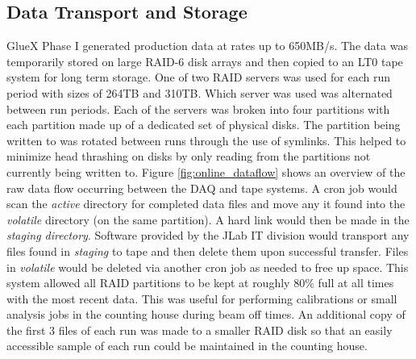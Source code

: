 


\subsection{Data Transport and Storage \label{sec:onlineprocessing}}

GlueX Phase I generated production data at rates up to 650MB/s. The data was temporarily stored on large RAID-6 disk arrays and then copied to an LT0 tape system for long term storage. One of two RAID servers was used for each run period with sizes of 264TB and 310TB. Which server was used was alternated between run periods. Each of the servers was broken into four partitions with each partition made up of a dedicated set of physical disks. The partition being written to was rotated between runs through the use of symlinks. This helped to minimize head thrashing on disks by only reading from the partitions not currently being written to. Figure \ref{fig:online_dataflow} shows an overview of the raw data flow occurring between the DAQ and tape systems. A cron job would scan the \textit{active} directory for completed data files and move any it found into the \textit{volatile} directory (on the same partition). A hard link would then be made in the \textit{staging directory}. Software provided by the JLab IT division would transport any files found in \textit{staging} to tape and then delete them upon successful transfer. Files in \textit{volatile} would be deleted via another cron job as needed to free up space. This system allowed all RAID partitions to be kept at roughly 80\% full at all times with the most recent data. This was useful for performing calibrations or small analysis jobs in the counting house during beam off times. An additional copy of the first 3 files of each run was made to a smaller RAID disk so that an easily accessible sample of each run could be maintained in the counting house.


